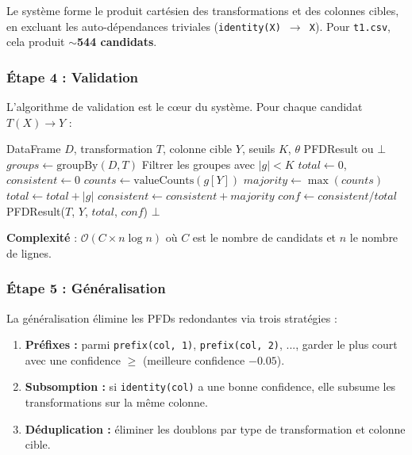 \documentclass[12pt,a4paper]{article}
\begin{document}
Le syst\`{e}me forme le produit cart\'{e}sien des transformations et des colonnes cibles, en excluant les auto-d\'{e}pendances triviales (\texttt{identity(X) $\rightarrow$ X}). Pour \texttt{t1.csv}, cela produit $\sim$\textbf{544 candidats}.

\subsubsection{\'{E}tape 4 : Validation}

L'algorithme de validation est le c\oe{}ur du syst\`{e}me. Pour chaque candidat $T(X) \rightarrow Y$ :

\begin{algorithm}[H]
\caption{Validation d'un candidat PFD}
\label{algo:validation}
\begin{algorithmic}[1]
\REQUIRE DataFrame $D$, transformation $T$, colonne cible $Y$, seuils $K$, $\theta$
\ENSURE PFDResult ou $\bot$
\STATE $\textit{groups} \leftarrow \text{groupBy}(D, T)$ 
\STATE Filtrer les groupes avec $|g| < K$
\STATE $\textit{total} \leftarrow 0$, $\textit{consistent} \leftarrow 0$
    \STATE $\textit{counts} \leftarrow \text{valueCounts}(g[Y])$
    \STATE $\textit{majority} \leftarrow \max(\textit{counts})$
    \STATE $\textit{total} \leftarrow \textit{total} + |g|$
    \STATE $\textit{consistent} \leftarrow \textit{consistent} + \textit{majority}$
\ENDFOR
\STATE $\textit{conf} \leftarrow \textit{consistent} / \textit{total}$
    \RETURN PFDResult($T$, $Y$, $\textit{total}$, $\textit{conf}$)
\ELSE
    \RETURN $\bot$
\ENDIF
\end{algorithmic}
\end{algorithm}

\textbf{Complexit\'{e}} : $\mathcal{O}(C \times n \log n)$ o\`{u} $C$ est le nombre de candidats et $n$ le nombre de lignes.

\subsubsection{\'{E}tape 5 : G\'{e}n\'{e}ralisation}

La g\'{e}n\'{e}ralisation \'{e}limine les PFDs redondantes via trois strat\'{e}gies :

\begin{enumerate}
    \item \textbf{Pr\'{e}fixes :} parmi \texttt{prefix(col, 1)}, \texttt{prefix(col, 2)}, ..., garder le plus court avec une confidence $\geq$ (meilleure confidence $- 0.05$).
    \item \textbf{Subsomption :} si \texttt{identity(col)} a une bonne confidence, elle subsume les transformations sur la m\^{e}me colonne.
    \item \textbf{D\'{e}duplication :} \'{e}liminer les doublons par type de transformation et colonne cible.
\end{enumerate}
\end{document}
